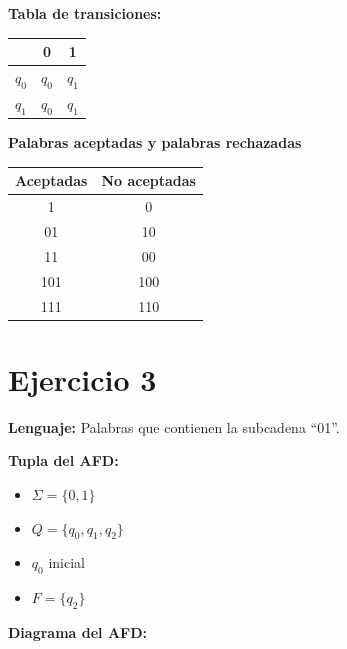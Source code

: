 \documentclass{article}
\begin{document}
\textbf{Tabla de transiciones:}

\begin{center}
\begin{tabular}{|c|c|c|}
\hline
 & 0 & 1 \\ \hline
$q_0$ & $q_0$ & $q_1$ \\ \hline
$q_1$ & $q_0$ & $q_1$ \\ \hline
\end{tabular}
\end{center}

\textbf{Palabras aceptadas y palabras rechazadas}
\begin{center}
\begin{tabular}{|c|c|}
\hline
Aceptadas & No aceptadas \\
\hline
1 & 0 \\
01 & 10 \\
11 & 00 \\
101 & 100 \\
111 & 110 \\
\hline
\end{tabular}
\end{center}

\section*{Ejercicio 3}
\textbf{Lenguaje:} Palabras que contienen la subcadena “01”.  

\textbf{Tupla del AFD:}
\begin{itemize}
    \item $\Sigma = \{0,1\}$
    \item $Q = \{q_0, q_1, q_2\}$
    \item $q_0$ inicial
    \item $F = \{q_2\}$
\end{itemize}

\textbf{Diagrama del AFD:}

\begin{center}
\end{center}
\end{document}
